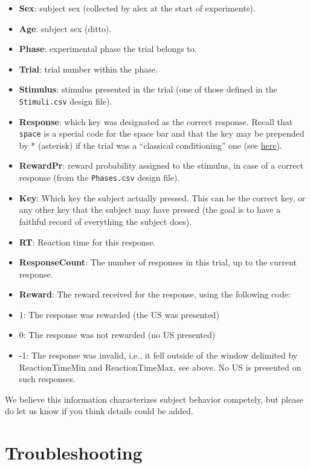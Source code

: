 \documentclass[11pt,]{article}
\begin{document}
\begin{itemize}
\item
  \textbf{Sex}: subject sex (collected by alex at the start of
  experiments).
\item
  \textbf{Age}: subject sex (ditto).
\item
  \textbf{Phase}: experimental phase the trial belongs to.
\item
  \textbf{Trial}: trial number within the phase.
\item
  \textbf{Stimulus}: stimulus presented in the trial (one of those
  defined in the \texttt{Stimuli.csv} design file).
\item
  \textbf{Response}: which key was designated as the correct response.
  Recall that \texttt{space} is a special code for the space bar and
  that the key may be prepended by * (asterisk) if the trial was a
  ``classical conditioning'' one (see \hyperref[responses]{here}).
\item
  \textbf{RewardPr}: reward probability assigned to the stimulus, in
  case of a correct response (from the \texttt{Phases.csv} design file).
\item
  \textbf{Key}: Which key the subject actually pressed. This can be the
  correct key, or any other key that the subject may have pressed (the
  goal is to have a faithful record of everything the subject does).
\item
  \textbf{RT}: Reaction time for this response.
\item
  \textbf{ResponseCount}: The number of responses in this trial, up to
  the current response.
\item
  \textbf{Reward}: The reward received for the response, using the
  following code:
\item
  1: The response was rewarded (the US was presented)
\item
  0: The response was not rewarded (no US presented)
\item
  -1: The response was invalid, i.e., it fell outside of the window
  delimited by ReactionTimeMin and ReactionTimeMax, see above. No US is
  presented on such responses.
\end{itemize}

We believe this information characterizes subject behavior competely,
but please do let us know if you think details could be added.

\section{Troubleshooting}
\end{document}
